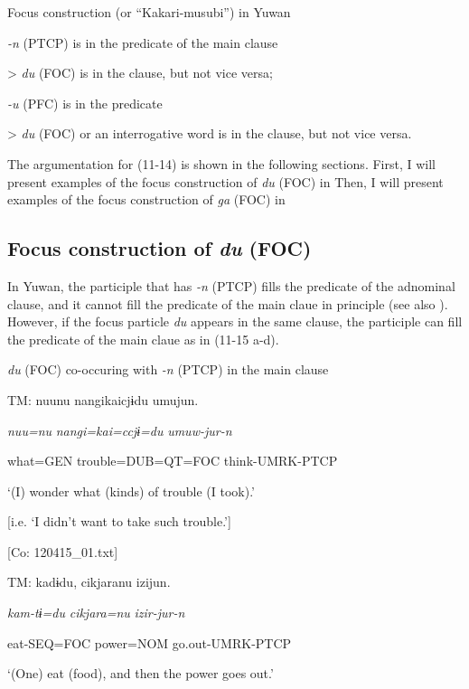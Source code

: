 \ea\label{ex:11-14}   Focus construction (or “Kakari-musubi”) in Yuwan

\ea   \textit{{}-n} (PTCP) is in the predicate of the main clause

> \textit{du} (FOC) is in the clause, but not vice versa;

\ex   \textit{{}-u} (PFC) is in the predicate

> \textit{du} (FOC) or an interrogative word is in the clause, but not vice versa.
\z
\z

The argumentation for (11-14) is shown in the following sections. First, I will present examples of the focus construction of \textit{du} (FOC) in  Then, I will present examples of the focus construction of \textit{ga} (FOC) in 

\subsection{Focus construction of \textit{du} (FOC)}\label{sec:11.3.1}

In Yuwan, the participle that has \textit{{}-n} (PTCP) fills the predicate of the adnominal clause, and it cannot fill the predicate of the main claue in principle (see also ). However, if the focus particle \textit{du} appears in the same clause, the participle can fill the predicate of the main claue as in (11-15 a-d).

\ea\label{ex:11-15}  \textit{du} (FOC) co-occuring with \textit{{}-n} (PTCP) in the main clause

  \ea\relax[= (6-108 a)]

    TM:  nuunu  nangikaicjɨdu  umujun.

      \textit{nuu=nu}  \textit{nangi=kai=ccjɨ=du}  \textit{umuw-jur-n}

      what=GEN  trouble=DUB=QT=FOC  think-UMRK-PTCP

      ‘(I) wonder what (kinds) of trouble (I took).’

[i.e. ‘I didn’t want to take such trouble.’]

      [Co: 120415\_01.txt]

  \ex  TM:  kadɨdu,  cikjaranu  izijun.

      \textit{kam-tɨ=du}  \textit{cikjara=nu}  \textit{izir-jur-n}

      eat-SEQ=FOC  power=NOM  go.out-UMRK-PTCP

      ‘(One) eat (food), and then the power goes out.’

